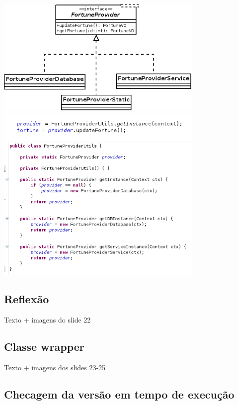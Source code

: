 \includegraphics[width=10cm]{img/implementacao_FortuneProvider}
\includegraphics[width=10cm]{img/instaciando_provider}
\includegraphics[width=10cm]{img/FortuneProviderUtils}
\subsection{Reflexão}

Texto + imagens do slide 22

\subsection{Classe wrapper}

Texto + imagens dos slides 23-25

\subsection{Checagem da versão em tempo de execução}

